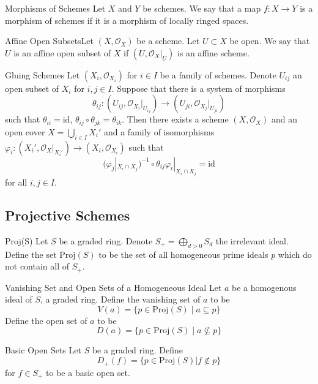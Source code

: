 \documentclass[a4paper]{article}
\begin{document}
\begin{defn}{Morphisms of Schemes}{} Let $X$ and $Y$ be schemes. We say that a map $f:X\to Y$ is a morphism of schemes if it is a morphism of locally ringed spaces. 
\end{defn}

\begin{defn}{Affine Open Subsets}{}Let $(X,\mathcal{O}_X)$ be a scheme. Let $U\subset X$ be open.  We say that $U$ is an affine open subset of $X$ if $(U,\mathcal{O}_X|_U)$ is an affine scheme. 
\end{defn}

\begin{thm}{Gluing Schemes}{} Let $(X_i,\mathcal{O}_{X_i})$ for $i\in I$ be a family of schemes. Denote $U_{ij}$ an open subset of $X_i$ for $i,j\in I$. Suppose that there is a system of morphisms $$\theta_{ij}:(U_{ij},\mathcal{O}_{X_i}|_{U_{ij}})\to(U_{ji},\mathcal{O}_{X_j}|_{U_{ji}})$$ such that $\theta_{ii}=\text{id}$, $\theta_{ij}\circ\theta_{jk}=\theta_{ik}$. Then there exists a scheme $(X,\mathcal{O}_X)$ and an open cover $X=\bigcup_{i\in I}X_i'$ and a family of isomorphisms $\varphi_i:(X_i',\mathcal{O}_X|_{X_i'})\to(X_i,\mathcal{O}_{X_i})$ such that $$(\varphi_j|_{X_i\cap X_j})^{-1}\circ\theta_{ij}\varphi_i|_{X_i\cap X_j}=\text{id}$$ for all $i,j\in I$. 
\end{thm}

\subsection{Projective Schemes}
\begin{defn}{Proj(S)}{} Let $S$ be a graded ring. Denote $S_+=\bigoplus_{d>0}S_d$ the irrelevant ideal. Define the set $\text{Proj}(S)$ to be the set of all homogeneous prime ideals $p$ which do not contain all of $S_+$. 
\end{defn}

\begin{defn}{Vanishing Set and Open Sets of a Homogeneous Ideal}{} Let $a$ be a homogenous ideal of $S$, a graded ring. Define the vanishing set of $a$ to be $$V(a)=\{p\in\text{Proj}(S)\;|\;a\subseteq p\}$$ Define the open set of $a$ to be $$D(a)=\{p\in\text{Proj}(S)\;|\;a\not\subseteq p\}$$
\end{defn}

\begin{defn}{Basic Open Sets}{} Let $S$ be a graded ring. Define $$D_+(f)=\{p\in\text{Proj}(S)|f\notin p\}$$ for $f\in S_+$ to be a basic open set. 
\end{defn}
\end{document}

